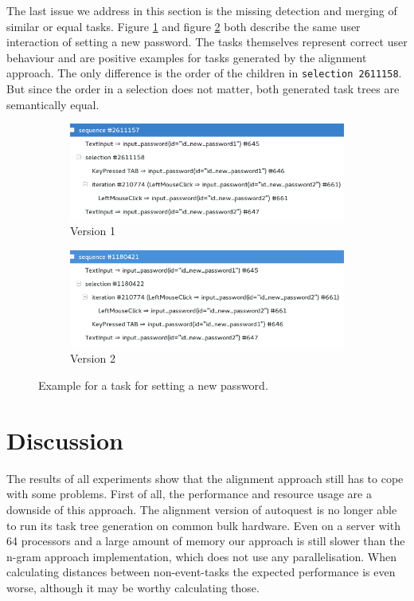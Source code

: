 The last issue we address in this section is the missing detection and merging of similar or equal tasks.
Figure \ref{fig:newpassword} and figure \ref{fig:newpassword-1} both describe the same user interaction of setting a new password. 
The tasks themselves represent correct user behaviour and are positive examples for tasks generated by the alignment approach.
The only difference is the order of the children in \texttt{selection 2611158}. 
But since the order in a selection does not matter, both generated task trees are semantically equal.
\begin{figure}[h!]
\begin{subfigure}[b]{\textwidth}
	\centering
	\includegraphics[scale=0.75]{chapters/casestudy/newpassword.png}
	\caption{Version 1}
	\label{fig:newpassword}
\end{subfigure}
\begin{subfigure}[b]{\textwidth}
	\centering
	\includegraphics[scale=0.75]{chapters/casestudy/newpassword-1.png}
	\caption{Version 2}
	\label{fig:newpassword-1}
\end{subfigure}
\caption{Example for a task for setting a new password.}
\label{fig:foo}
\end{figure}

\section{Discussion}
The results of all experiments show that the alignment approach still has to cope with some problems.
First of all, the performance and resource usage are a downside of this approach. 
The alignment version of autoquest is no longer able to run its task tree generation on common bulk hardware. 
Even on a server with 64 processors and a large amount of memory our approach is still slower than the n-gram approach implementation, which does not use any parallelisation.
When calculating distances between non-event-tasks the expected performance is even worse, although it may be worthy calculating those.


